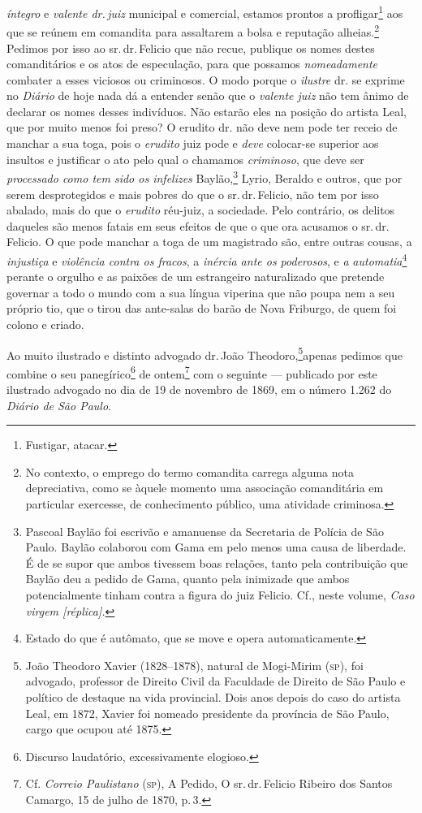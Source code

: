 \emph{íntegro} e \emph{valente dr.\,juiz} municipal e comercial, estamos
prontos a profligar\footnote{ Fustigar, atacar.} aos que se reúnem em
comandita para assaltarem a bolsa e reputação alheias.\footnote{ No
  contexto, o emprego do termo comandita carrega alguma nota
  depreciativa, como se àquele momento uma associação comanditária em
  particular exercesse, de conhecimento público, uma atividade
  criminosa.} Pedimos por isso ao sr.\,dr.\,Felicio que não recue,
publique os nomes destes comanditários e os atos de especulação, para
que possamos \emph{nomeadamente} combater a esses viciosos ou
criminosos. O modo porque o \emph{ilustre} dr. se exprime no
\emph{Diário} de hoje nada dá a entender senão que o \emph{valente juiz}
não tem ânimo de declarar os nomes desses indivíduos. Não estarão eles
na posição do artista Leal, que por muito menos foi preso? O erudito dr.
não deve nem pode ter receio de manchar a sua toga, pois o
\emph{erudito} juiz pode e \emph{deve} colocar-se superior aos insultos
e justificar o ato pelo qual o chamamos \emph{criminoso}, que deve ser
\emph{processado como tem sido os infelizes} Baylão,\footnote{ Pascoal
  Baylão foi escrivão e amanuense da Secretaria de Polícia de São Paulo.
  Baylão colaborou com Gama em pelo menos uma causa de liberdade. É de
  se supor que ambos tivessem boas relações, tanto pela contribuição que
  Baylão deu a pedido de Gama, quanto pela inimizade que ambos
  potencialmente tinham contra a figura do juiz Felicio. Cf., neste
  volume, \emph{Caso virgem {[}réplica{]}.}} Lyrio, Beraldo e outros,
que por serem desprotegidos e mais pobres do que o sr.\,dr.\,Felicio, não
tem por isso abalado, mais do que o \emph{erudito} réu-juiz, a
sociedade. Pelo contrário, os delitos daqueles são menos fatais em seus
efeitos de que o que ora acusamos o sr.\,dr.\,Felicio. O que pode manchar
a toga de um magistrado são, entre outras cousas, a \emph{injustiça} e
\emph{violência contra os fracos}, a \emph{inércia ante os poderosos}, e
\emph{a} \emph{automatia}\footnote{ Estado do que é autômato, que se
  move e opera automaticamente.} perante o orgulho e as paixões de um
estrangeiro naturalizado que pretende governar a todo o mundo com a sua
língua viperina que não poupa nem a seu próprio tio, que o tirou das
ante-salas do barão de Nova Friburgo, de quem foi colono e criado.

Ao muito ilustrado e distinto advogado dr.\,João Theodoro,\footnote{ João Theodoro Xavier (1828--1878), natural de Mogi-Mirim
  (\textsc{sp}), foi advogado, professor de Direito Civil da Faculdade de Direito
  de São Paulo e político de destaque na vida provincial. Dois anos
  depois do caso do artista Leal, em 1872, Xavier foi nomeado presidente
  da província de São Paulo, cargo que ocupou até 1875.}apenas pedimos
que combine o seu panegírico\footnote{ Discurso laudatório,
  excessivamente elogioso.} de ontem\footnote{ Cf. \emph{Correio
  Paulistano} (\textsc{sp}), A Pedido, O sr.\,dr.\,Felicio Ribeiro dos Santos
  Camargo, 15 de julho de 1870, p.\,3.} com o seguinte --- publicado por este
ilustrado advogado no dia de 19 de novembro de 1869, em o número 1.262
do \emph{Diário de São Paulo}.

